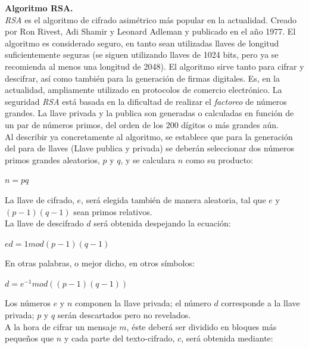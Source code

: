 \documentclass[12pt, a4paper, titlepage]{report}
\begin{document}
    		\textbf{Algoritmo RSA.}\\
    		\textit{RSA} es el algoritmo de cifrado asimétrico más popular en la actualidad. Creado por Ron Rivest, Adi Shamir y Leonard Adleman y publicado en el año 1977. El algoritmo es considerado seguro, en tanto sean utilizadas llaves de longitud suficientemente seguras (se siguen utilizando llaves de 1024 bits, pero ya se recomienda al menos una longitud de 2048). El algoritmo sirve tanto para cifrar y descifrar, así como también para la generación de firmas digitales. Es, en la actualidad, ampliamente utilizado en protocolos de comercio electrónico. La seguridad \textit{RSA} está basada en la dificultad de realizar el \textit{factoreo} de números grandes. La llave privada y la publica son generadas o calculadas en función de un par de números primos, del orden de los 200 dígitos o más grandes aún. \cite{refCriptografia} \\
    		Al describir ya concretamente al algoritmo, se establece que para la generación del para de llaves (Llave publica y privada) se deberán seleccionar dos números primos grandes aleatorios, $p$ y $q$, y se calculara $n$ como su producto:
    		
    		\begin{center}
    		    $n=pq$
    		\end{center}
    		
    		La llave de cifrado, $e$, será elegida también de manera aleatoria, tal que $e$ y $(p-1)(q-1)$ sean primos relativos.\\
    		La llave de descifrado $d$ será obtenida despejando la ecuación:
    		
    		\begin{center}
    		    $ed=1 mod (p-1)(q-1)$
    		\end{center}
    		
    		En otras palabras, o mejor dicho, en otros símbolos:
    		
    		\begin{center}
    		    $d=e^{-1} mod ((p-1)(q-1))$
    		\end{center}
		    
		    Los números $e$ y $n$ componen la llave privada; el número $d$ corresponde a la llave privada; $p$ y $q$ serán descartados pero no revelados.\\
		    A la hora de cifrar un mensaje $m$, éste deberá ser dividido en bloques más pequeños que $n$ y cada parte del texto-cifrado, $c$, será obtenida mediante:
		    
\end{document}
